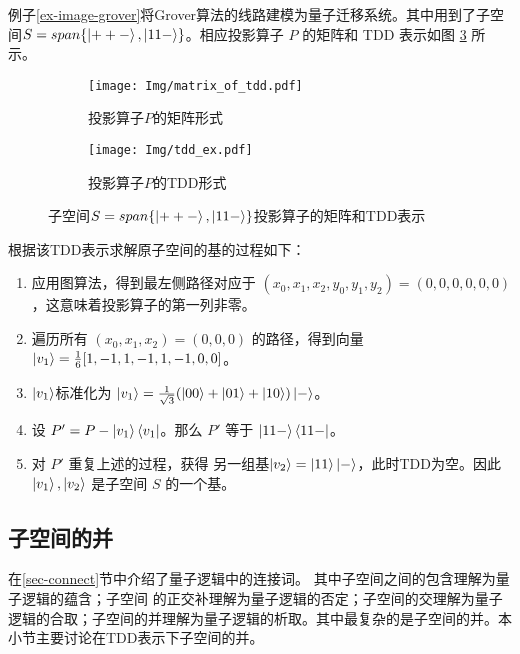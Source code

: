 \begin{example}
    \label{ex-image-sub}
    例子\ref{ex-image-grover}将Grover算法的线路建模为量子迁移系统。其中用到了子空间$S=span\{\ket{++-},\ket{11-}\}$。相应投影算子 $P$ 的矩阵和 TDD 表示如图 \ref{fig:P} 所示。
    \begin{figure}[!htbp]
        \begin{subfigure}[c]{0.45\textwidth}
            \centering
            \texttt{[image: Img/matrix\_of\_tdd.pdf]}
            \caption{投影算子$P$的矩阵形式}
            \label{fig:mat_P}
        \end{subfigure}
        \begin{subfigure}[c]{0.45\textwidth}
            \centering
            \texttt{[image: Img/tdd\_ex.pdf]}
            \caption{投影算子$P$的TDD形式}
            \label{fig:tdd_P}
        \end{subfigure}
        \caption{子空间$S=span\{\ket{++-},\ket{11-}\}$投影算子的矩阵和TDD表示}
        \label{fig:P}
    \end{figure}
    根据该TDD表示求解原子空间的基的过程如下：
    \begin{enumerate}
        \item 应用图算法，得到最左侧路径对应于 $(x_0,x_1,x_2,y_0,y_1,y_2)=(0,0,0,0,0,0)$，这意味着投影算子的第一列非零。
        \item 遍历所有 $(x_0,x_1,x_2)=(0,0,0)$ 的路径，得到向量 $\ket{v_1}=\frac{1}{6}[1,-1,1,-1,1,-1,0,0]$。
        \item $\ket{v_1}$标准化为 $\ket{v_1}=\frac{1}{\sqrt{3}}(\ket{00}+\ket{01}+\ket{10})\ket{-}$。
        \item 设 $P'=P-\ket{v_1}\bra{v_1}$。那么 $P'$ 等于 $\ket{11-}\bra{11-}$。
        \item 对 $P'$ 重复上述的过程，获得 另一组基$\ket{v_2}=\ket{11}\ket{-}$，此时TDD为空。因此 ${\ket{v_1},\ket{v_2}}$ 是子空间 $S$ 的一个基。
    \end{enumerate}
\end{example}
\subsection{子空间的并}
在\ref{sec-connect}节中介绍了量子逻辑中的连接词。
其中子空间之间的包含理解为量子逻辑的蕴含；子空间 的正交补理解为量子逻辑的否定；子空间的交理解为量子逻辑的合取；子空间的并理解为量子逻辑的析取。其中最复杂的是子空间的并。本小节主要讨论在TDD表示下子空间的并。

